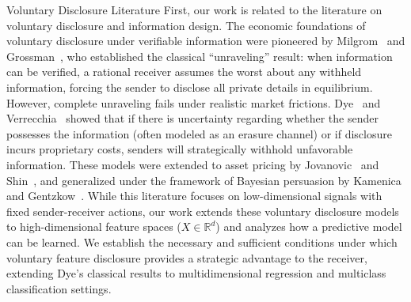 \begin{sourceblock}{Voluntary Disclosure Literature}
First, our work is related to the literature on voluntary disclosure and information design. The economic foundations of voluntary disclosure under verifiable information were pioneered by Milgrom~\cite{milgrom1981good} and Grossman~\cite{grossman1981informational}, who established the classical ``unraveling'' result: when information can be verified, a rational receiver assumes the worst about any withheld information, forcing the sender to disclose all private details in equilibrium. However, complete unraveling fails under realistic market frictions. Dye~\cite{dye1985disclosure} and Verrecchia~\cite{verrecchia1983discretionary} showed that if there is uncertainty regarding whether the sender possesses the information (often modeled as an erasure channel) or if disclosure incurs proprietary costs, senders will strategically withhold unfavorable information. These models were extended to asset pricing by Jovanovic~\cite{jovanovic1982truthful} and Shin~\cite{shin2003disclosures}, and generalized under the framework of Bayesian persuasion by Kamenica and Gentzkow~\cite{kamenica2011bayesian}. While this literature focuses on low-dimensional signals with fixed sender-receiver actions, our work extends these voluntary disclosure models to high-dimensional feature spaces ($X \in \mathbb{R}^d$) and analyzes how a predictive model can be learned. We establish the necessary and sufficient conditions under which voluntary feature disclosure provides a strategic advantage to the receiver, extending Dye's classical results to multidimensional regression and multiclass classification settings.
\end{sourceblock}

\begin{faqblock}
\faqanswers
{}
\end{faqblock}

